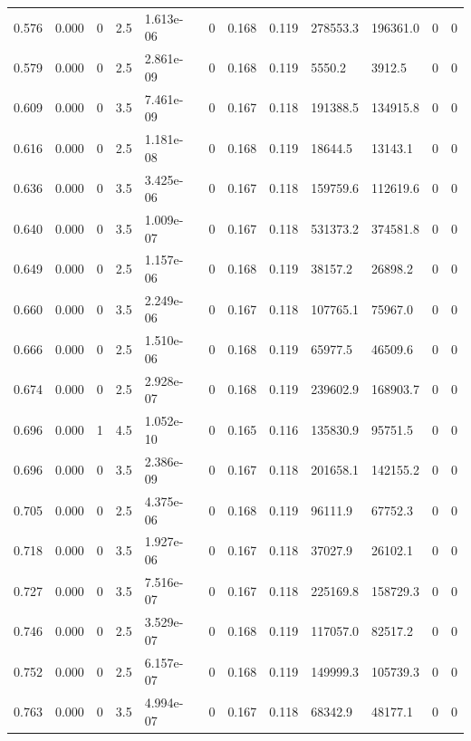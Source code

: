 \documentclass[preview]{standalone}
\begin{document}
{{{\begin{tabular}{L{1.2cm}C{1.2cm} C{0.3cm}C{0.5cm} C{1.4cm}C{1.4cm} C{1.4cm}C{1.4cm} C{1.6cm}C{1.6cm} C{1.6cm}C{1.6cm}}
  0.576  &  0.000  & 0     & 2.5 &  1.613e-06  & 0  &  0.168&   0.119& 278553.3 & 196361.0   &  0 & 0  \\ 
  0.579  &  0.000  & 0     & 2.5 &  2.861e-09  & 0  &  0.168&   0.119& 5550.2 & 3912.5   &  0 & 0  \\ 
  0.609  &  0.000  & 0     & 3.5 &  7.461e-09  & 0  &  0.167&   0.118& 191388.5 & 134915.8   &  0 & 0  \\ 
  0.616  &  0.000  & 0     & 2.5 &  1.181e-08  & 0  &  0.168&   0.119& 18644.5 & 13143.1   &  0 & 0  \\ 
  0.636  &  0.000  & 0     & 3.5 &  3.425e-06  & 0  &  0.167&   0.118& 159759.6 & 112619.6   &  0 & 0  \\ 
  0.640  &  0.000  & 0     & 3.5 &  1.009e-07  & 0  &  0.167&   0.118& 531373.2 & 374581.8   &  0 & 0  \\ 
  0.649  &  0.000  & 0     & 2.5 &  1.157e-06  & 0  &  0.168&   0.119& 38157.2 & 26898.2   &  0 & 0  \\ 
  0.660  &  0.000  & 0     & 3.5 &  2.249e-06  & 0  &  0.167&   0.118& 107765.1 & 75967.0   &  0 & 0  \\ 
  0.666  &  0.000  & 0     & 2.5 &  1.510e-06  & 0  &  0.168&   0.119& 65977.5 & 46509.6   &  0 & 0  \\ 
  0.674  &  0.000  & 0     & 2.5 &  2.928e-07  & 0  &  0.168&   0.119& 239602.9 & 168903.7   &  0 & 0  \\ 
  0.696  &  0.000  & 1     & 4.5 &  1.052e-10  & 0  &  0.165&   0.116& 135830.9 & 95751.5   &  0 & 0  \\ 
  0.696  &  0.000  & 0     & 3.5 &  2.386e-09  & 0  &  0.167&   0.118& 201658.1 & 142155.2   &  0 & 0  \\ 
  0.705  &  0.000  & 0     & 2.5 &  4.375e-06  & 0  &  0.168&   0.119& 96111.9 & 67752.3   &  0 & 0  \\ 
  0.718  &  0.000  & 0     & 3.5 &  1.927e-06  & 0  &  0.167&   0.118& 37027.9 & 26102.1   &  0 & 0  \\ 
  0.727  &  0.000  & 0     & 3.5 &  7.516e-07  & 0  &  0.167&   0.118& 225169.8 & 158729.3   &  0 & 0  \\ 
  0.746  &  0.000  & 0     & 2.5 &  3.529e-07  & 0  &  0.168&   0.119& 117057.0 & 82517.2   &  0 & 0  \\ 
  0.752  &  0.000  & 0     & 2.5 &  6.157e-07  & 0  &  0.168&   0.119& 149999.3 & 105739.3   &  0 & 0  \\ 
  0.763  &  0.000  & 0     & 3.5 &  4.994e-07  & 0  &  0.167&   0.118& 68342.9 & 48177.1   &  0 & 0  \\ 

\end{tabular}}}}
\end{document}
